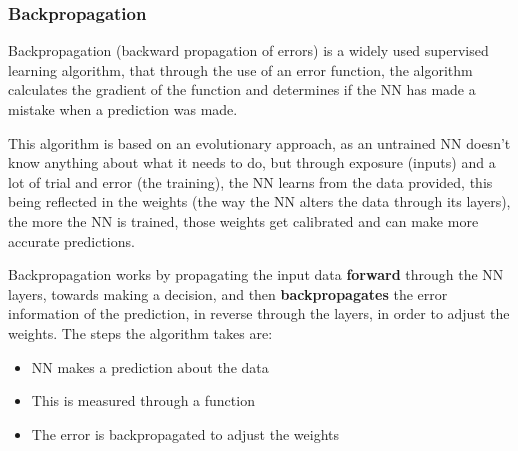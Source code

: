 \documentclass[12pt,a4paper]{article}
\begin{document}
\subsubsection{Backpropagation}
Backpropagation (backward propagation of errors) is a widely used supervised learning algorithm, that through the use of an error function, the algorithm calculates the gradient of the function and determines if the NN has made a mistake when a prediction was made.\par
This algorithm is based on an evolutionary approach, as an untrained NN doesn’t know anything about what it needs to do, but through exposure (inputs) and a lot of trial and error (the training), the NN learns from the data provided, this being reflected in the weights (the way the NN alters the data through its layers), the more the NN is trained, those weights get calibrated and can make more accurate predictions.\par
Backpropagation works by propagating the input data \textbf{forward} through the NN layers, towards making a decision, and then \textbf{backpropagates} the error information of the prediction, in reverse through the layers, in order to adjust the weights.\cite{chris_nicholson_beginners_2019}  The steps the algorithm takes are:
\begin{itemize}
	\item NN makes a prediction about the data
	\item This is measured through a function
	\item The error is backpropagated to adjust the weights
\end{itemize}

\newpage
	
	
\end{document}
